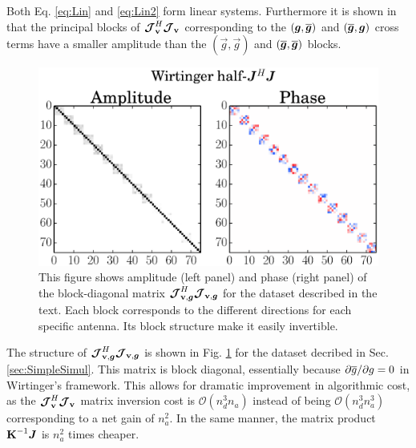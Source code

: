 

Both Eq. \ref{eq:Lin} and \ref{eq:Lin2} form linear
systems. Furthermore it is shown in \citet[][in prep]{SmirnovTasse14}
that the principal blocks of $\bm{\mathcal{J}}_{\textbf{v}}^H\bm{\mathcal{J}}_{\textbf{v}}$ corresponding to the
$(\vec{g},\conj{\vec{g}})$ and $(\conj{\vec{g}},\vec{g})$ cross
terms have a smaller amplitude than the $(\vec{g},\vec{g})$ and
$(\conj{\vec{g}},\conj{\vec{g}})$ blocks.


\begin{figure}[h!]
\begin{center}
\includegraphics[width=\columnwidth]{HalfJHJ2.eps}
\caption{\label{fig:HalfJHJ} This figure shows amplitude (left panel)
  and phase (right panel) of the block-diagonal matrix $\bm{\mathcal{J}}_{\textbf{v},\bm{g}}^H\bm{\mathcal{J}}_{\textbf{v},\bm{g}}$
  for the dataset described in the text. Each block corresponds to the
different directions for each specific antenna. Its block structure
make it easily invertible.}
\end{center}
\end{figure}

The structure of $\bm{\mathcal{J}}_{\textbf{v},\bm{g}}^H\bm{\mathcal{J}}_{\textbf{v},\bm{g}}$ is shown in Fig. \ref{fig:HalfJHJ} for
the dataset decribed in Sec. \ref{sec:SimpleSimul}. This
matrix is block diagonal, essentially because 
$\partial \overline{g}/\partial g=0$ in Wirtinger's framework. This allows
for dramatic improvement in algorithmic cost, as the $\bm{\mathcal{J}}_{\textbf{v}}^H\bm{\mathcal{J}}_{\textbf{v}}$ matrix
inversion cost is $\mathcal{O}\left(n_d^3n_a\right)$ instead of being
$\mathcal{O}\left(n_d^3n_a^3\right)$ corresponding to a net gain of $n^2_a$. In the same manner, the
matrix product $\textbf{K}^{-1}\bm{J}$ is $n^2_a$ times cheaper.

